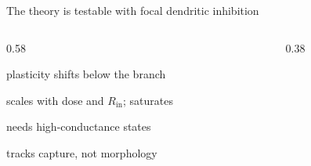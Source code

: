 \begin{frame}{The theory is testable with focal dendritic inhibition}
  \begin{columns}[T,onlytextwidth]
    \begin{column}{0.58\textwidth}
      \vspace{0.10cm}
      \par
      {\footnotesize plasticity shifts below the branch\par}
      \vspace{0.18cm}
      \par
      {\footnotesize scales with dose and $R_{\mathrm{in}}$; saturates\par}
      \vspace{0.18cm}
      \par
      {\footnotesize needs high-conductance states\par}
      \vspace{0.18cm}
      \par
      {\footnotesize tracks capture, not morphology\par}
    \end{column}
    \begin{column}{0.38\textwidth}
      \centering
      \CreditTree[mode=shunt,shunted=true,scale=0.98,stagelabel={focal dendritic inhibition}]
    \end{column}
  \end{columns}
  \vfill
  \vspace{0.04cm}
\end{frame}

